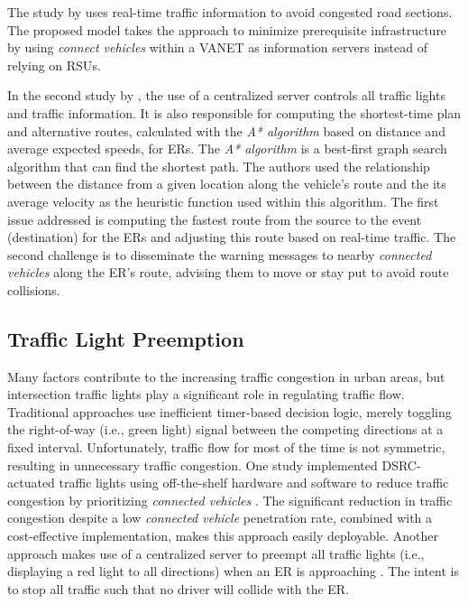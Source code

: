 The study by \cite{Rizvi2007} uses real-time traffic information to avoid congested road sections. The proposed model takes the approach to minimize prerequisite infrastructure by using \textit{connect vehicles} within a \acrshort{VANET} as information servers instead of relying on \acrshort{RSU}s.

In the second study by \cite{Huang2009}, the use of a centralized server controls all traffic lights and traffic information. It is also responsible for computing the shortest-time plan and alternative routes, calculated with the \textit{A* algorithm} based on distance and average expected speeds, for \acrshort{ER}s. The \textit{\gls{A* algorithm}} is a best-first graph search algorithm that can find the shortest path. The authors used the relationship between the distance from a given location along the vehicle's route and the its average velocity as the heuristic function used within this algorithm. The first issue addressed is computing the fastest route from the source to the event (destination) for the \acrshort{ER}s and adjusting this route based on real-time traffic. The second challenge is to disseminate the warning messages to nearby \textit{connected vehicles} along the \acrshort{ER}'s route, advising them to move or stay put to avoid route collisions.

\subsection{Traffic Light Preemption}
Many factors contribute to the increasing traffic congestion in urban areas, but intersection traffic lights play a significant role in regulating traffic flow. Traditional approaches use inefficient timer-based decision logic, merely toggling the right-of-way (i.e., green light) signal between the competing directions at a fixed interval. Unfortunately, traffic flow for most of the time is not symmetric, resulting in unnecessary traffic congestion. One study implemented \acrshort{DSRC}-actuated traffic lights using off-the-shelf hardware and software to reduce traffic congestion by prioritizing \textit{connected vehicles} \cite{Tonguz2020}. The significant reduction in traffic congestion despite a low \textit{connected vehicle} penetration rate, combined with a cost-effective implementation, makes this approach easily deployable. Another approach makes use of a centralized server to preempt all traffic lights (i.e., displaying a red light to all directions) when an \acrshort{ER} is approaching \cite{Vlad2008}. The intent is to stop all traffic such that no driver will collide with the \acrshort{ER}.

